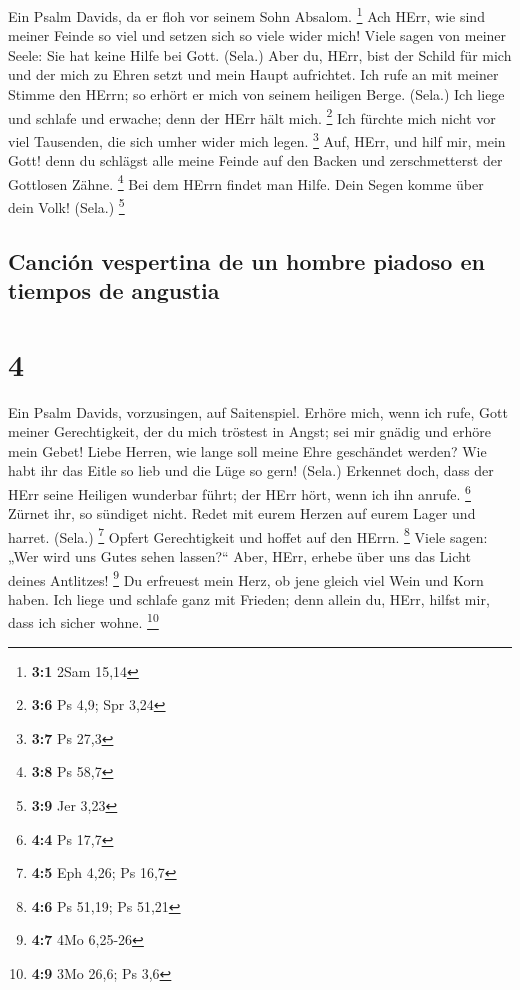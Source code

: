  Ein Psalm Davids, da er floh vor seinem Sohn Absalom.
\footnote{\textbf{3:1} 2Sam 15,14}  Ach HErr, wie sind
meiner Feinde so viel und setzen sich so viele wider mich!
 Viele sagen von meiner Seele: Sie hat keine Hilfe bei
Gott. (Sela.)  Aber du, HErr, bist der Schild für mich und
der mich zu Ehren setzt und mein Haupt aufrichtet.  Ich
rufe an mit meiner Stimme den HErrn; so erhört er mich von seinem
heiligen Berge. (Sela.)  Ich liege und schlafe und
erwache; denn der HErr hält mich. \footnote{\textbf{3:6} Ps 4,9; Spr
  3,24}  Ich fürchte mich nicht vor viel Tausenden, die
sich umher wider mich legen. \footnote{\textbf{3:7} Ps 27,3}
 Auf, HErr, und hilf mir, mein Gott! denn du schlägst alle
meine Feinde auf den Backen und zerschmetterst der Gottlosen Zähne.
\footnote{\textbf{3:8} Ps 58,7}  Bei dem HErrn findet man
Hilfe. Dein Segen komme über dein Volk! (Sela.) \footnote{\textbf{3:9}
  Jer 3,23}

\hypertarget{canciuxf3n-vespertina-de-un-hombre-piadoso-en-tiempos-de-angustia}{%
\subsection{Canción vespertina de un hombre piadoso en tiempos de
angustia}\label{canciuxf3n-vespertina-de-un-hombre-piadoso-en-tiempos-de-angustia}}

\hypertarget{section-3}{%
\section{4}\label{section-3}}

 Ein Psalm Davids, vorzusingen, auf Saitenspiel.
 Erhöre mich, wenn ich rufe, Gott meiner Gerechtigkeit,
der du mich tröstest in Angst; sei mir gnädig und erhöre mein Gebet!
 Liebe Herren, wie lange soll meine Ehre geschändet
werden? Wie habt ihr das Eitle so lieb und die Lüge so gern! (Sela.)
 Erkennet doch, dass der HErr seine Heiligen wunderbar
führt; der HErr hört, wenn ich ihn anrufe. \footnote{\textbf{4:4} Ps
  17,7}  Zürnet ihr, so sündiget nicht. Redet mit eurem
Herzen auf eurem Lager und harret. (Sela.) \footnote{\textbf{4:5} Eph
  4,26; Ps 16,7}  Opfert Gerechtigkeit und hoffet auf den
HErrn. \footnote{\textbf{4:6} Ps 51,19; Ps 51,21}  Viele
sagen: „Wer wird uns Gutes sehen lassen?{}`` Aber, HErr, erhebe über uns
das Licht deines Antlitzes! \footnote{\textbf{4:7} 4Mo 6,25-26}
 Du erfreuest mein Herz, ob jene gleich viel Wein und Korn
haben.  Ich liege und schlafe ganz mit Frieden; denn
allein du, HErr, hilfst mir, dass ich sicher wohne. \footnote{\textbf{4:9}
  3Mo 26,6; Ps 3,6}

